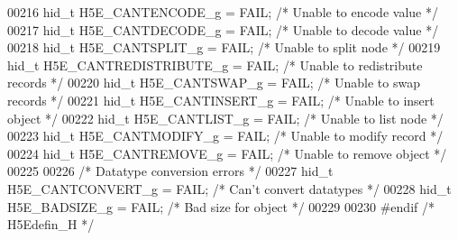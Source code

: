\begin{DoxyCode}
00216 hid\_t H5E\_CANTENCODE\_g     = FAIL;      \textcolor{comment}{/* Unable to encode value */}
00217 hid\_t H5E\_CANTDECODE\_g     = FAIL;      \textcolor{comment}{/* Unable to decode value */}
00218 hid\_t H5E\_CANTSPLIT\_g      = FAIL;      \textcolor{comment}{/* Unable to split node */}
00219 hid\_t H5E\_CANTREDISTRIBUTE\_g = FAIL;      \textcolor{comment}{/* Unable to redistribute records */}
00220 hid\_t H5E\_CANTSWAP\_g       = FAIL;      \textcolor{comment}{/* Unable to swap records */}
00221 hid\_t H5E\_CANTINSERT\_g     = FAIL;      \textcolor{comment}{/* Unable to insert object */}
00222 hid\_t H5E\_CANTLIST\_g       = FAIL;      \textcolor{comment}{/* Unable to list node */}
00223 hid\_t H5E\_CANTMODIFY\_g     = FAIL;      \textcolor{comment}{/* Unable to modify record */}
00224 hid\_t H5E\_CANTREMOVE\_g     = FAIL;      \textcolor{comment}{/* Unable to remove object */}
00225 
00226 \textcolor{comment}{/* Datatype conversion errors */}
00227 hid\_t H5E\_CANTCONVERT\_g    = FAIL;      \textcolor{comment}{/* Can't convert datatypes */}
00228 hid\_t H5E\_BADSIZE\_g        = FAIL;      \textcolor{comment}{/* Bad size for object */}
00229 
00230 \textcolor{preprocessor}{#endif }\textcolor{comment}{/* H5Edefin\_H */}\textcolor{preprocessor}{}
\end{DoxyCode}
